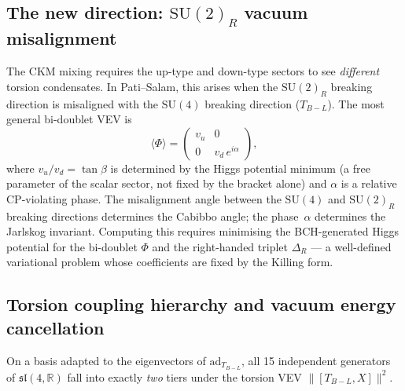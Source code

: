 \documentclass[11pt,a4paper]{article}
\theoremstyle{plain}
\theoremstyle{definition}
\theoremstyle{remark}
\begin{document}
\subsection*{The new direction: $\mathrm{SU}(2)_R$ vacuum misalignment}

The CKM mixing requires the up-type and down-type sectors to see
\emph{different} torsion condensates.  In Pati--Salam, this arises
when the $\mathrm{SU}(2)_R$ breaking direction is misaligned with the
$\mathrm{SU}(4)$ breaking direction ($T_{B{-}L}$).  The most general
bi-doublet VEV is
\[
  \langle\Phi\rangle = \begin{pmatrix} v_u & 0 \\ 0 & v_d\,e^{i\alpha} \end{pmatrix},
\]
where $v_u/v_d = \tan\beta$ is determined by the Higgs potential minimum
(a free parameter of the scalar sector, not fixed by the bracket alone) and
$\alpha$ is a relative CP-violating phase.  The misalignment angle
between the $\mathrm{SU}(4)$ and $\mathrm{SU}(2)_R$ breaking
directions determines the Cabibbo angle; the phase~$\alpha$
determines the Jarlskog invariant.  Computing this requires
minimising the BCH-generated Higgs potential for the bi-doublet
$\Phi$ and the right-handed triplet $\Delta_R$ --- a well-defined
variational problem whose coefficients are fixed by the Killing form.

\subsection{Torsion coupling hierarchy and vacuum energy cancellation}
\label{sec:torsion-hierarchy}

On a basis adapted to the eigenvectors of $\mathrm{ad}_{T_{B{-}L}}$, all 15
independent generators of $\mathfrak{sl}(4,\mathbb{R})$ fall into exactly
\emph{two} tiers under the torsion VEV $\|[T_{B{-}L}, X]\|^2$.
\end{document}
